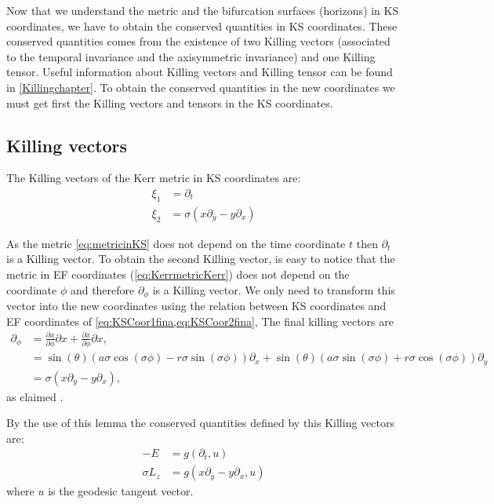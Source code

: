 Now that we understand the metric and the bifurcation surfaces (horizons) in \gls{KS} coordinates, we have to obtain the conserved quantities in \gls{KS} coordinates. These conserved quantities comes from the existence of two Killing vectors (associated to the temporal invariance and the axisymmetric invariance) and one Killing tensor. Useful information about Killing vectors and Killing tensor can be found in \vref{Killingchapter}. To obtain the conserved quantities in the new coordinates we must get first the Killing vectors and tensors in the \gls{KS} coordinates.

\subsection{Killing vectors}
\begin{lemma}
 The Killing vectors of the Kerr metric in \gls{KS} coordinates are:
 \begin{align}
  \xi_1&=\partial_t\\
  \xi_2&=\sigma( x \partial_y - y \partial_x)
 \end{align}
\end{lemma}
 \begin{Proof}
  As the metric \cref{eq:metricinKS} does not depend on the time coordinate $t$ then $\partial_t$ is a Killing vector. To obtain the second Killing vector, is easy to notice that the metric in \gls{EF} coordinates (\cref{eq:KerrmetricKerr}) does not depend on the coordinate $\phi$ and therefore $\partial_\phi$ is a Killing vector. We only need to transform this vector into the new coordinates using the relation between \gls{KS} coordinates and \gls{EF} coordinates of \cref{eq:KSCoor1fina,eq:KSCoor2fina}, The final killing vectors are
  \begin{equation}
  \begin{aligned}
   \partial_\phi&= \frac{\partial x}{\partial \phi} \partial x + \frac{\partial x}{\partial \phi} \partial x \nonumber,\\
   &= \sin (\theta ) (a \sigma  \cos (\sigma  \phi )-r \sigma  \sin (\sigma  \phi )) \partial_x + \sin (\theta ) (a \sigma  \sin (\sigma  \phi )+r \sigma  \cos (\sigma  \phi )) \partial_y \nonumber\\
   &=\sigma( x \partial_y - y \partial_x),
   \end{aligned}
  \end{equation}
  as claimed .\end{Proof}
  
By the use of this lemma the conserved quantities defined by this Killing vectors are:
 \begin{align}
  -E &= g(\partial_t,u)\\
  \sigma L_z&= g( x \partial_y - y \partial_x,u) \label{angulardef}
 \end{align}
where $u$ is the geodesic tangent vector.
 
